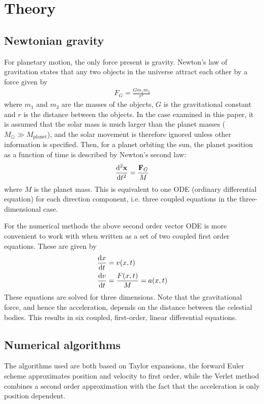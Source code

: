 \documentclass[aps,reprint]{revtex4-1}
\begin{document}
\section{Theory}
\label{sec:theory}
\subsection{Newtonian gravity}
For planetary motion, the only force present is gravity. Newton's law of gravitation
states that any two objects in the universe attract each other by a force given
by
\begin{align}
  F_G = \frac{G m_1 m_2}{r^2}
\end{align}
where $m_1$ and $m_2$ are the masses of the objects, $G$ is the
gravitational constant and $r$ is the distance between the objects. In the
case examined in this paper, it is assumed that the solar mass is much larger
than the planet masses ($M_\odot \gg M_\text{planet}$), and the solar
movement is therefore ignored unless other information is specified.
Then, for a planet orbiting the sun, the
planet position as a function of time is described by Newton's second law:
\begin{align*}
  \dv[2]{\mathbf{x}}{t} = \frac{\mathbf{F}_G}{M}
\end{align*}
where $M$ is the planet mass. This is equivalent to one ODE (ordinary differential
equation) for each direction component, i.e. three coupled equations in the
three-dimensional case.

For the numerical methods the above second order vector ODE is more convenient to
work with when written as a set of two coupled first order equations. These
are given by
\begin{align}
  \begin{split}
  \label{eq:coupledequations}
  \dv{x}{t} &= v(x,t) \\
  \dv{v}{t} &= \frac{F(x,t)}{M} = a(x,t)
  \end{split}
\end{align}
These equations are solved for three dimensions. Note that the gravitational force,
and hence the acceleration, depends on the distance between the celestial bodies.
This results in six coupled, first-order, linear differential equations.

\subsection{Numerical algorithms}
\label{sec:numalgos}
The algorithms used are both based on Taylor expansions, the forward Euler
scheme approximates position and velocity to first order, while the Verlet
method combines a second order approximation with the fact that the acceleration
is only position dependent.
\end{document}
